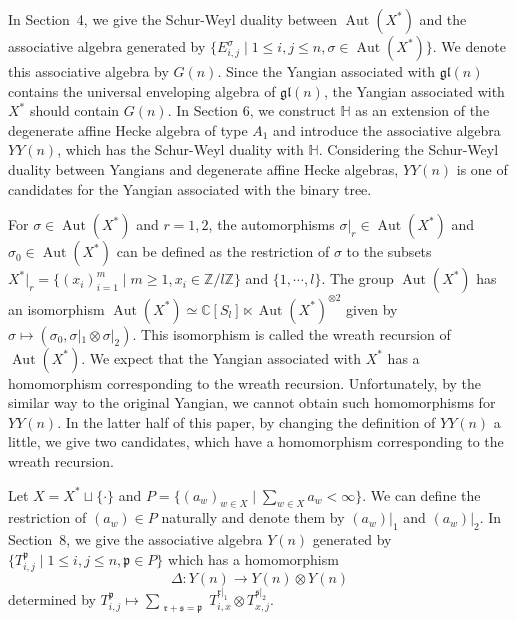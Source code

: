 \documentclass{article}
\theoremstyle{definition}
\theoremstyle{remark}
\numberwithin{equation}{section}
\DeclareMathOperator{\Aut}{Aut}
\numberwithin{equation}{section}
\begin{document}
In Section~4, we give the Schur-Weyl duality between $\Aut(X^*)$ and the associative algebra generated by $\{E_{i,j}^\sigma\mid1\leq i,j\leq n,\sigma\in\Aut(X^*)\}$. We denote this associative algebra by $G(n)$. Since the Yangian associated with $\mathfrak{gl}(n)$ contains the universal enveloping algebra of $\mathfrak{gl}(n)$, the Yangian associated with $X^*$ should contain $G(n)$. In Section 6, we construct $\mathbb{H}$ as an extension of the degenerate affine Hecke algebra of type $A_1$ and introduce the associative algebra $YY(n)$, which has the Schur-Weyl duality with $\mathbb{H}$. Considering the Schur-Weyl duality between Yangians and degenerate affine Hecke algebras, $YY(n)$ is one of candidates for the Yangian associated with the binary tree.

For $\sigma\in\Aut(X^*)$ and $r=1,2$, the automorphisms $\sigma|_r\in\Aut(X^*)$ and $\sigma_0\in\Aut(X^*)$ can be defined as the restriction of $\sigma$ to the subsets $X^*|_r=\{(x_i)_{i=1}^m\mid m\geq1,x_i\in\mathbb{Z}/l\mathbb{Z}\}$ and $\{1,\cdots,l\}$. 
The group $\Aut(X^*)$ has an isomorphism $\Aut(X^*)\simeq\mathbb{C}[S_l]\ltimes\Aut(X^*)^{\otimes2}$ given by $\sigma\mapsto(\sigma_0,\sigma|_1\otimes\sigma|_2)$. This isomorphism is called the wreath recursion of $\Aut(X^*)$. We expect that the Yangian associated with $X^*$ has a homomorphism corresponding to the wreath recursion. Unfortunately, by the similar way to the original Yangian, we cannot obtain such homomorphisms for $YY(n)$. In the latter half of this paper, by changing the definition of $YY(n)$ a little, we give two candidates, which have a homomorphism corresponding to the wreath recursion.

Let $X=X^*\sqcup\{\cdot\}$ and $P=\{(a_w)_{w\in X}\mid \sum_{w\in X}a_w<\infty\}$. We can define the restriction of $(a_w)\in P$ naturally and denote them by $(a_w)|_1$ and $(a_w)|_2$. In Section~8, we give the associative algebra $Y(n)$ generated by $\{T^{\mathfrak{p}}_{i,j}\mid1\leq i,j\leq n,\mathfrak{p}\in P\}$ which has a homomorphism
\[\Delta\colon Y(n)\to Y(n)\otimes Y(n)\]
determined by $T^{\mathfrak{p}}_{i,j}\mapsto\sum_{\substack{\mathfrak{r}+\mathfrak{s}=\mathfrak{p}}}T^{\mathfrak{r}|_1}_{i,x}\otimes T^{\mathfrak{s}|_2}_{x,j}$.
\end{document}
